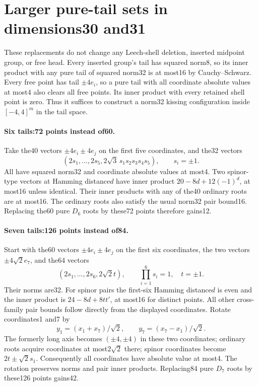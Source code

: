 \section*{Larger pure-tail sets in dimensions30 and31}
These replacements do not change any Leech-shell deletion, inserted
midpoint group, or free head. Every inserted group's tail has squared
norm8, so its inner product with any pure tail of squared norm32 is at
most16 by Cauchy--Schwarz. Every free point has tail $\pm4e_i$, so a
pure tail with all coordinate absolute values at most4 also clears all
free points. Its inner product with every retained shell point is zero.
Thus it suffices to construct a norm32 kissing configuration inside
$[-4,4]^m$ in the tail space.

\paragraph{Six tails:72 points instead of60.}
Take the40 vectors $\pm4e_i\pm4e_j$ on the first five coordinates,
and the32 vectors
\[
 (2s_1,\ldots,2s_5,2\sqrt3\,s_1s_2s_3s_4s_5),\qquad s_i=\pm1.
\]
All have squared norm32 and coordinate absolute values at most4.
Two spinor-type vectors at Hamming distance$d$ have inner product
$20-8d+12(-1)^d$, at most16 unless identical. Their inner products with
any of the40 ordinary roots are at most16. The ordinary roots also
satisfy the usual norm32 pair bound16. Replacing the60 pure $D_6$ roots
by these72 points therefore gains12.

\paragraph{Seven tails:126 points instead of84.}
Start with the60 vectors $\pm4e_i\pm4e_j$ on the first six coordinates,
the two vectors $\pm4\sqrt2e_7$, and the64 vectors
\[
 (2s_1,\ldots,2s_6,2\sqrt2t),\qquad \prod_{i=1}^6s_i=1,\quad t=\pm1.
\]
Their norms are32. For spinor pairs the first-six Hamming distance$d$
is even and the inner product is $24-8d+8tt'$, at most16 for distinct
points. All other cross-family pair bounds follow directly from the
displayed coordinates. Rotate coordinates1 and7 by
\[
 y_1=(x_1+x_7)/\sqrt2,\qquad y_7=(x_7-x_1)/\sqrt2.
\]
The formerly long axis becomes $(\pm4,\pm4)$ in these two coordinates;
ordinary roots acquire coordinates at most$2\sqrt2$ there; spinor
coordinates become $2t\pm\sqrt2s_1$. Consequently all coordinates
have absolute value at most4. The rotation preserves norms and pair
inner products. Replacing84 pure $D_7$ roots by these126 points gains42.

